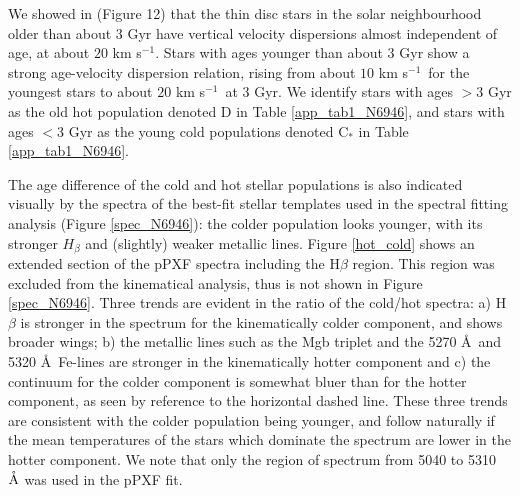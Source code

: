 \documentclass[fleqn,usenatbib]{mnras}
\newcommand{\kms}{km s$^{-1}$}
\begin{document}
We showed in  (Figure 12) that the thin disc stars in the solar neighbourhood older than about 3 Gyr have vertical velocity dispersions almost independent of age, at about $20$ \kms. Stars with ages younger than about 3 Gyr show a strong age-velocity dispersion relation, rising from about $10$ \kms\ for the youngest stars to about $20$ \kms\ at 3 Gyr. We identify stars with ages $> 3$ Gyr as the old hot population denoted D in Table \ref{app_tab1_N6946}, and stars with ages $< 3$ Gyr as the young cold populations denoted C$_*$ in Table \ref{app_tab1_N6946}. 

The age difference of the cold and hot stellar populations is also indicated visually by the spectra of the best-fit stellar templates used in the spectral fitting analysis (Figure \ref{spec_N6946}): the colder population looks younger, with its stronger $H_\beta$ and (slightly) weaker metallic lines. Figure \ref{hot_cold} shows an extended section of the pPXF spectra including the H$\beta$ region. This region  was excluded from the kinematical analysis, thus is not shown in Figure \ref{spec_N6946}. Three trends are evident in the ratio of the cold/hot spectra: a) H$\beta$ is stronger in the spectrum for the kinematically colder component, and shows broader wings;  b) the metallic lines such as the Mgb triplet and the 5270 \AA\ and 5320 \AA\ Fe-lines are stronger in the kinematically hotter component and c) the continuum for the colder component is somewhat bluer than for the hotter component, as seen by reference to the horizontal dashed line. These three trends are consistent with the colder population being younger, and follow naturally if the mean temperatures of the stars which dominate the spectrum are lower in the hotter component. We note that only the region of spectrum from 5040 to 5310 $\rm \mathring{A}$ was used in the pPXF fit.
\end{document}
